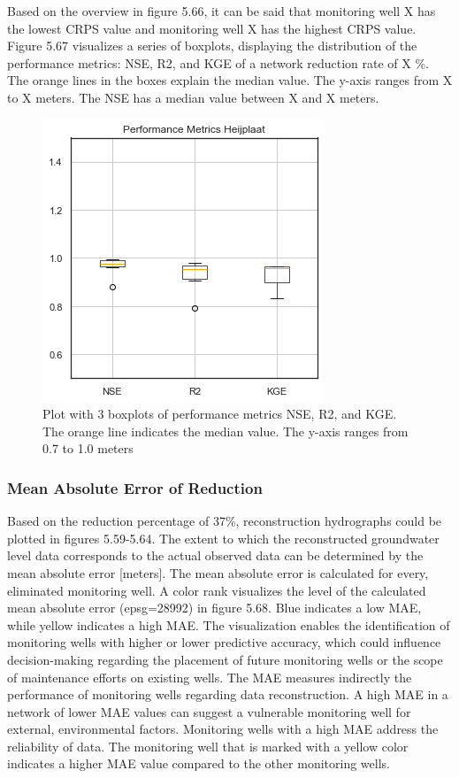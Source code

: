 Based on the overview in figure 5.66, it can be said that monitoring well X has the lowest CRPS value and monitoring well X has the highest CRPS value. 
\newline
\newline
Figure 5.67 visualizes a series of boxplots, displaying the distribution of the performance metrics: NSE, R2, and KGE of a network reduction rate of X \%. The orange lines in the boxes explain the median value. The y-axis ranges from X to X meters. The NSE has a median value between X and X meters. 



\begin{figure}[htbp]
    \centering
    \includegraphics[width=0.45\linewidth]{boxheij.png}
    \caption{Plot with 3 boxplots of performance metrics NSE, R2, and KGE. The orange line indicates the median value. The y-axis ranges from 0.7 to 1.0 meters}
\end{figure}


\clearpage
\subsubsection{Mean Absolute Error of Reduction}
Based on the reduction percentage of 37\%, reconstruction hydrographs could be plotted in figures 5.59-5.64. The extent to which the reconstructed groundwater level data corresponds to the actual observed data can be determined by the mean absolute error [meters]. The mean absolute error is calculated for every, eliminated monitoring well. A color rank visualizes the level of the calculated mean absolute error (epsg=28992) in figure 5.68. Blue indicates a low MAE, while yellow indicates a high MAE. The visualization enables the identification of monitoring wells with higher or lower predictive accuracy, which could influence decision-making regarding the placement of future monitoring wells or the scope of maintenance efforts on existing wells. The MAE measures indirectly the performance of monitoring wells regarding data reconstruction. A high MAE in a network of lower MAE values can suggest a vulnerable monitoring well for external, environmental factors. Monitoring wells with a high MAE address the reliability of data. The monitoring well that is marked with a yellow color indicates a higher MAE value compared to the other monitoring wells. 

